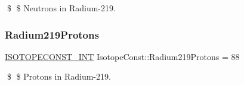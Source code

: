 \$ \$ Neutrons in Radium-\/219. \mbox{\label{group___isotope_const-_radium-_ra219_ga613e40f145750217e90b1135d374c75a}} 
\subsubsection{\texorpdfstring{Radium219\+Protons}{Radium219Protons}}
{\footnotesize\ttfamily \mbox{\hyperlink{group___isotope_const-_macros_ga5f18360b3e99483a35c32d789e62621c}{I\+S\+O\+T\+O\+P\+E\+C\+O\+N\+S\+T\+\_\+\+I\+NT}} Isotope\+Const\+::\+Radium219\+Protons = 88}

\$ \$ Protons in Radium-\/219. 